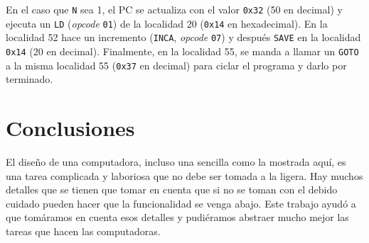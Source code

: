 \documentclass{article}
\begin{document}
En el caso que \texttt{N} sea 1, el PC se actualiza con el valor \texttt{0x32} (50 en decimal) y ejecuta un \texttt{LD} (\textit{opcode} \texttt{01}) de la localidad 20 (\texttt{0x14} en hexadecimal). En la localidad 52 hace un incremento (\texttt{INCA}, \textit{opcode} \texttt{07}) y después \texttt{SAVE} en la localidad \texttt{0x14} (20 en decimal). Finalmente, en la localidad 55, se manda a llamar un \texttt{GOTO} a la misma localidad 55 (\texttt{0x37} en decimal) para ciclar el programa y darlo por terminado.

\section{Conclusiones}

El diseño de una computadora, incluso una sencilla como la mostrada aquí, es una tarea complicada y laboriosa que no debe ser tomada a la ligera. Hay muchos detalles que se tienen que tomar en cuenta que si no se toman con el debido cuidado pueden hacer que la funcionalidad se venga abajo. Este trabajo ayudó a que tomáramos en cuenta esos detalles y pudiéramos abstraer mucho mejor las tareas que hacen las computadoras.

\printbibliography
\nocite{*}
\end{document}
